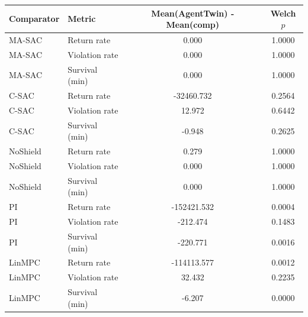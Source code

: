 \begin{tabular}{llcc}
\toprule
Comparator & Metric & Mean(AgentTwin) - Mean(comp) & Welch $p$\\
\midrule
MA-SAC & Return rate & 0.000 & 1.0000\\
MA-SAC & Violation rate & 0.000 & 1.0000\\
MA-SAC & Survival (min) & 0.000 & 1.0000\\
C-SAC & Return rate & -32460.732 & 0.2564\\
C-SAC & Violation rate & 12.972 & 0.6442\\
C-SAC & Survival (min) & -0.948 & 0.2625\\
NoShield & Return rate & 0.279 & 1.0000\\
NoShield & Violation rate & 0.000 & 1.0000\\
NoShield & Survival (min) & 0.000 & 1.0000\\
PI & Return rate & -152421.532 & 0.0004\\
PI & Violation rate & -212.474 & 0.1483\\
PI & Survival (min) & -220.771 & 0.0016\\
LinMPC & Return rate & -114113.577 & 0.0012\\
LinMPC & Violation rate & 32.432 & 0.2235\\
LinMPC & Survival (min) & -6.207 & 0.0000\\
\bottomrule
\end{tabular}